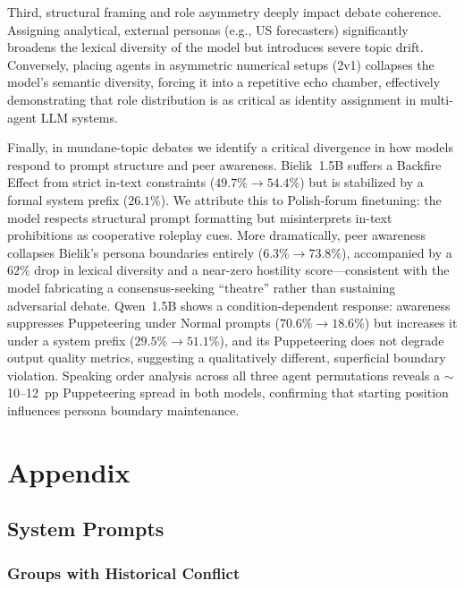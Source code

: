 \documentclass[twoside,11pt]{article}
\begin{document}
Third, structural framing and role asymmetry deeply impact debate coherence. Assigning analytical, external personas (e.g., US forecasters) significantly broadens the lexical diversity of the model but introduces severe topic drift. Conversely, placing agents in asymmetric numerical setups (2v1) collapses the model's semantic diversity, forcing it into a repetitive echo chamber, effectively demonstrating that role distribution is as critical as identity assignment in multi-agent LLM systems.

Finally, in mundane-topic debates we identify a critical divergence in how models respond to prompt structure and peer awareness. Bielik~1.5B suffers a Backfire Effect from strict in-text constraints ($49.7\% \to 54.4\%$) but is stabilized by a formal system prefix ($26.1\%$). We attribute this to Polish-forum finetuning: the model respects structural prompt formatting but misinterprets in-text prohibitions as cooperative roleplay cues. More dramatically, peer awareness collapses Bielik's persona boundaries entirely ($6.3\% \to 73.8\%$), accompanied by a $62\%$ drop in lexical diversity and a near-zero hostility score---consistent with the model fabricating a consensus-seeking ``theatre'' rather than sustaining adversarial debate. Qwen~1.5B shows a condition-dependent response: awareness suppresses Puppeteering under Normal prompts ($70.6\% \to 18.6\%$) but increases it under a system prefix ($29.5\% \to 51.1\%$), and its Puppeteering does not degrade output quality metrics, suggesting a qualitatively different, superficial boundary violation. Speaking order analysis across all three agent permutations reveals a $\sim$10--12~pp Puppeteering spread in both models, confirming that starting position influences persona boundary maintenance.

 


\clearpage

\appendix

\section{Appendix}

\subsection{System Prompts}

\subsubsection{Groups with Historical Conflict}
\end{document}
